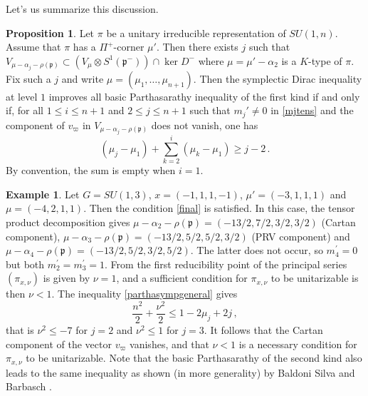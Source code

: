\documentclass{amsart}[draft,11pt]
\newcommand{\fp}{{\mathfrak{p}}}
\numberwithin{equation}{section}
\theoremstyle{definition}
\newtheorem{proposition}[theorem]{Proposition}
\newtheorem{example}[theorem]{Example}
\begin{document}
Let's us summarize this discussion.
\begin{proposition}
Let $\pi$ be a unitary irreducible representation 
of $SU(1,n)$. Assume that $\pi$ has a $\Pi^+$-corner $\mu'$. Then there exists $j$ such that $V_{\mu-\alpha_j-\rho(\fp)}  \subset (V_\mu\otimes S^1(\fp^-))\cap \ker D^-$ where $\mu=\mu'-\alpha_2$ is a $K$-type of $\pi$. Fix such a $j$ and write
$\mu=(\mu_1,\ldots,\mu_{n+1})$. Then the symplectic
Dirac inequality at level $1$ improves all basic Parthasarathy inequality of the first kind if and only if, for all $1\leq i \leq n+1$ and $2\leq j \leq n+1$ such that $m_j'\neq 0$ in \eqref{mjtens} and the component of $v_\varpi$ in
$V_{\mu-\alpha_j-\rho(\fp)}$ does not vanish, one has
\begin{equation}\label{final}
    (\mu_j-\mu_1)+\sum_{k=2}^i (\mu_k-\mu_1)
    \geq
    j-2
    \,.
\end{equation}
By convention, the sum is empty when $i=1$.
\end{proposition}

\begin{example}
Let $G=SU(1,3)$, $x=(-1,1,1,-1)$, $\mu'=(-3,1,1,1)$ and $\mu=(-4,2,1,1)$. Then the condition \eqref{final} is satisfied. In this case, the tensor product decomposition gives $\mu-\alpha_2-\rho({\mathfrak p})=(-13/2,7/2,3/2,3/2)$ (Cartan component), $\mu-\alpha_3-\rho({\mathfrak p})=(-13/2,5/2,5/2,3/2)$ (PRV component) and $\mu-\alpha_4-\rho({\mathfrak p})=(-13/2,5/2,3/2,5/2)$. The latter does not occur, so $m_4^\prime=0$ but both $m_2^\prime=m_3^\prime=1$. From \cite[Proposition 1]{kraljevic} the first reducibility point of the principal series $(\pi_{x,\nu})$ is given by $\nu=1$, and a sufficient condition for $\pi_{x,\nu}$ to be unitarizable is then $\nu<1$. The inequality \eqref{parthasympgeneral} gives 
$$ \frac{n^2}{2}+\frac{\nu^2}{2} \leq 1 -2\mu_j+2j \,,$$
that is $\nu^2\leq -7$ for $j=2$ and $\nu^2\leq 1$ for $j=3$. It follows that the Cartan component of the vector
$v_\varpi$ vanishes, and that  $\nu<1$ is a necessary condition for $\pi_{x,\nu}$ to be unitarizable. Note that the basic Parthasarathy of the second kind also leads to the same inequality as shown (in more generality) by Baldoni Silva and Barbasch \cite{baldoni-barbasch}. 
\end{example}



\end{document}
